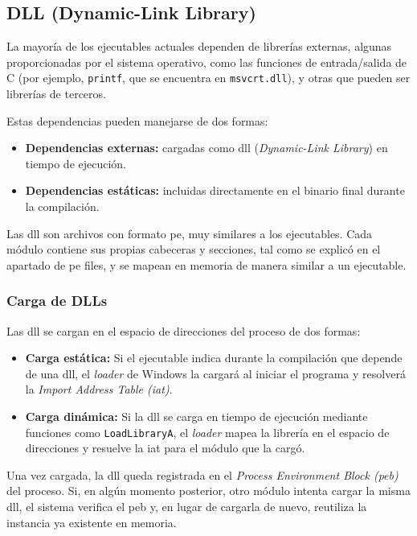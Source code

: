 \subsection{DLL (Dynamic-Link Library)}

La mayoría de los ejecutables actuales dependen de librerías externas, algunas proporcionadas por el sistema operativo, como las funciones de entrada/salida de C (por ejemplo, \texttt{printf}, que se encuentra en \texttt{msvcrt.dll}), y otras que pueden ser librerías de terceros.  

Estas dependencias pueden manejarse de dos formas:

\begin{itemize}
    \item \textbf{Dependencias externas:} cargadas como \acrshort{dll} (\textit{Dynamic-Link Library}) en tiempo de ejecución.
    \item \textbf{Dependencias estáticas:} incluidas directamente en el binario final durante la compilación.
\end{itemize}

Las \acrshort{dll} son archivos con formato \acrshort{pe}, muy similares a los ejecutables. Cada módulo contiene sus propias cabeceras y secciones, tal como se explicó en el apartado de \acrshort{pe} files, y se mapean en memoria de manera similar a un ejecutable.

\subsubsection{Carga de DLLs}

Las \acrshort{dll} se cargan en el espacio de direcciones del proceso de dos formas:

\begin{itemize}
    \item \textbf{Carga estática:} Si el ejecutable indica durante la compilación que depende de una \acrshort{dll}, el \textit{loader} de Windows la cargará al iniciar el programa y resolverá la \textit{Import Address Table (\acrshort{iat})}.
    \item \textbf{Carga dinámica:} Si la \acrshort{dll} se carga en tiempo de ejecución mediante funciones como \texttt{LoadLibraryA}, el \textit{loader} mapea la librería en el espacio de direcciones y resuelve la \acrshort{iat} para el módulo que la cargó.
\end{itemize}

Una vez cargada, la \acrshort{dll} queda registrada en el \textit{Process Environment Block (\acrshort{peb})} del proceso. Si, en algún momento posterior, otro módulo intenta cargar la misma \acrshort{dll}, el sistema verifica el \acrshort{peb} y, en lugar de cargarla de nuevo, reutiliza la instancia ya existente en memoria.

